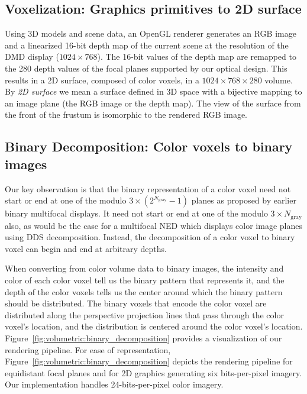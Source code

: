 
\subsection{Voxelization: Graphics primitives to 2D surface}
\label{sec:volumetric:Voxelization}
Using 3D models and scene data, an OpenGL renderer generates an RGB image and a linearized 16-bit depth map of the current scene at the resolution of the DMD display ($1024 \times 768$). 
The 16-bit values of the depth map are remapped to the 280 depth values of the focal planes supported by our optical design. 
This results in a 2D surface, composed of color voxels, in a $1024 \times 768 \times 280$ volume. 
By \emph{2D surface} we mean a surface defined in 3D space with a bijective mapping to an image plane (the RGB image or the depth map). 
The view of the surface from the front of the frustum is isomorphic to the rendered RGB image.

\subsection{Binary Decomposition: Color voxels to binary images}
\label{sec:volumetric:fixed_pipeline}

Our key observation is that the binary representation of a color voxel need not start or end at one of the modulo $3 \times (2^{N_{\text{gray}}} - 1)$ planes as proposed by earlier binary multifocal displays. It need not start or end at one of the modulo $3 \times N_{\text{gray}}$ also, as would be the case for a multifocal NED which displays color image planes using DDS decomposition. Instead, the decomposition of a color voxel to binary voxel can begin and end at arbitrary depths. 



When converting from color volume data to binary images, the intensity and color of each color voxel tell us the binary pattern that represents it, and the depth of the color voxels tells us the center around which the binary pattern should be distributed. The binary voxels that encode the color voxel are distributed along the perspective projection lines that pass through the color voxel's location, and the distribution is centered around the color voxel's location. Figure~\ref{fig:volumetric:binary_decomposition} provides a visualization of our rendering pipeline. For ease of representation, Figure~\ref{fig:volumetric:binary_decomposition} depicts the rendering pipeline for equidistant focal planes and for 2D graphics generating six bits-per-pixel imagery. Our implementation handles 24-bits-per-pixel color imagery.


